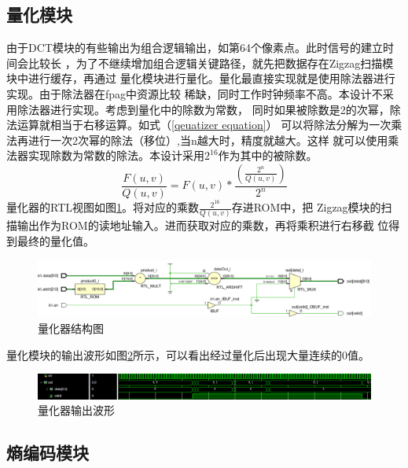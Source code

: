 \documentclass{article}
\numberwithin {equation}{section}
\begin{document}
\begin{spacing}{1.25}
  \subsection{量化模块}
      由于DCT模块的有些输出为组合逻辑输出，如第64个像素点。此时信号的建立时间会比较长
      ，为了不继续增加组合逻辑关键路径，就先把数据存在Zigzag扫描模块中进行缓存，再通过
      量化模块进行量化。量化最直接实现就是使用除法器进行实现。由于除法器在fpag中资源比较
      稀缺，同时工作时钟频率不高。本设计不采用除法器进行实现。考虑到量化中的除数为常数，
      同时如果被除数是2的次幂，除法运算就相当于右移运算。如式（\ref{qeuatizer equation}）
      可以将除法分解为一次乘法再进行一次2次幂的除法（移位）,当n越大时，精度就越大。这样
      就可以使用乘法器实现除数为常数的除法。本设计采用$2^{16}$作为其中的被除数。
      \begin{equation}
        \frac{F(u,v)}{Q(u,v)}=F(u,v)*\frac{\left(\frac{2^{n}}{Q(u,v)}\right)}{2^{n}}
        \label{qeuatizer equation}
      \end{equation}
      量化器的RTL视图如图\ref{quantizer}。将对应的乘数$\frac{2^{16}}{Q(u,v)}$存进ROM中，把
      Zigzag模块的扫描输出作为ROM的读地址输入。进而获取对应的乘数，再将乘积进行右移截
      位得到最终的量化值。
      \begin{figure}[H]
        \centering
        \includegraphics[scale=0.5]{./pictures/quantizer.png}
        \caption{量化器结构图}
        \label{quantizer}
      \end{figure}
      量化模块的输出波形如图\ref{quantizer wave}所示，可以看出经过量化后出现大量连续的0值。
      \begin{figure}[H]
        \centering
        \includegraphics[scale=0.5]{./pictures/quantizerSim.png}
        \caption{量化器输出波形}
        \label{quantizer wave}
      \end{figure}



  \subsection{熵编码模块}
    \vspace{1em}

\end{spacing}
\end{document}

